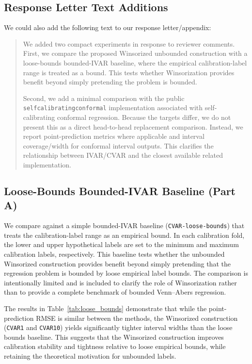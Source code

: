 \documentclass{article}
\begin{document}
\subsection{Response Letter Text Additions}

We could also add the following text to our response letter/appendix:
\begin{quote}
We added two compact experiments in response to reviewer comments. First, we compare the proposed Winsorized unbounded construction with a loose-bounds bounded-IVAR baseline, where the empirical calibration-label range is treated as a bound. This tests whether Winsorization provides benefit beyond simply pretending the problem is bounded.

Second, we add a minimal comparison with the public \texttt{selfcalibratingconformal} implementation associated with self-calibrating conformal regression. Because the targets differ, we do not present this as a direct head-to-head replacement comparison. Instead, we report point-prediction metrics where applicable and interval coverage/width for conformal interval outputs. This clarifies the relationship between IVAR/CVAR and the closest available related implementation.
\end{quote}

\subsection{Loose-Bounds Bounded-IVAR Baseline (Part A)}

We compare against a simple bounded-IVAR baseline (\texttt{CVAR-loose-bounds}) that treats the calibration-label range as an empirical bound. In each calibration fold, the lower and upper hypothetical labels are set to the minimum and maximum calibration labels, respectively. This baseline tests whether the unbounded Winsorized construction provides benefit beyond simply pretending that the regression problem is bounded by loose empirical label bounds. The comparison is intentionally limited and is included to clarify the role of Winsorization rather than to provide a complete benchmark of bounded Venn--Abers regression.

The results in Table~\ref{tab:loose_bounds} demonstrate that while the point-prediction RMSE is similar between the methods, the Winsorized construction (\texttt{CVAR1} and \texttt{CVAR10}) yields significantly tighter interval widths than the loose bounds baseline. This suggests that the Winsorized construction improves calibration stability and tightness relative to loose empirical bounds, while retaining the theoretical motivation for unbounded labels.
\end{document}
